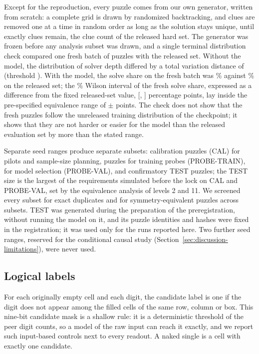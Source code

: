 Except for the reproduction, every puzzle comes from our own generator, written from scratch: a complete grid is drawn by randomized backtracking, and clues are removed one at a time in random order as long as the solution stays unique, until exactly  clues remain, the clue count of the released hard set. The generator was frozen before any analysis subset was drawn, and a single terminal distribution check compared one fresh batch of  puzzles with the released set. Without the model, the distribution of solver depth differed by a total variation distance of  (threshold ). With the model, the solve share on the fresh batch was \% against \% on the released set; the \% Wilson interval of the fresh solve share, expressed as a difference from the fixed released-set value, [, ] percentage points, lay inside the pre-specified equivalence range of $\pm$ points. The check does not show that the fresh puzzles follow the unreleased training distribution of the checkpoint; it shows that they are not harder or easier for the model than the released evaluation set by more than the stated range.

Separate seed ranges produce separate subsets:  calibration puzzles (CAL) for pilots and sample-size planning,  puzzles for training probes (PROBE-TRAIN),  for model selection (PROBE-VAL), and  confirmatory TEST puzzles; the TEST size is the largest of the requirements simulated before the lock on CAL and PROBE-VAL, set by the equivalence analysis of levels 2 and 11. We screened every subset for exact duplicates and for symmetry-equivalent puzzles across subsets. TEST was generated during the preparation of the preregistration, without running the model on it, and its puzzle identities and hashes were fixed in the registration; it was used only for the runs reported here. Two further seed ranges, reserved for the conditional causal study (Section~\ref{sec:discussion-limitations}), were never used.

\subsection{Logical labels}
\label{sec:setup-labels}

For each originally empty cell and each digit, the candidate label is one if the digit does not appear among the filled cells of the same row, column or box. This nine-bit candidate mask is a shallow rule: it is a deterministic threshold of the peer digit counts, so a model of the raw input can reach it exactly, and we report such input-based controls next to every readout. A naked single is a cell with exactly one candidate.

